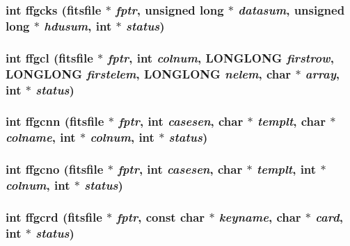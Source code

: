 \subsubsection{\setlength{\rightskip}{0pt plus 5cm}int ffgcks (\bf{fitsfile} $\ast$ {\em fptr}, unsigned long $\ast$ {\em datasum}, unsigned long $\ast$ {\em hdusum}, int $\ast$ {\em status})}\label{fitsio__64_8h_ac550539cbf9b960d2f9e4c8619a50d5}


\subsubsection{\setlength{\rightskip}{0pt plus 5cm}int ffgcl (\bf{fitsfile} $\ast$ {\em fptr}, int {\em colnum}, \bf{LONGLONG} {\em firstrow}, \bf{LONGLONG} {\em firstelem}, \bf{LONGLONG} {\em nelem}, char $\ast$ {\em array}, int $\ast$ {\em status})}\label{fitsio__64_8h_d208fea0ab2ac53456307cdc890b07ca}


\subsubsection{\setlength{\rightskip}{0pt plus 5cm}int ffgcnn (\bf{fitsfile} $\ast$ {\em fptr}, int {\em casesen}, char $\ast$ {\em templt}, char $\ast$ {\em colname}, int $\ast$ {\em colnum}, int $\ast$ {\em status})}\label{fitsio__64_8h_64f9be429b2bc87b2c632dc87da8c647}


\subsubsection{\setlength{\rightskip}{0pt plus 5cm}int ffgcno (\bf{fitsfile} $\ast$ {\em fptr}, int {\em casesen}, char $\ast$ {\em templt}, int $\ast$ {\em colnum}, int $\ast$ {\em status})}\label{fitsio__64_8h_b16df66331ffdbe091b4bf638c2fb3fb}


\subsubsection{\setlength{\rightskip}{0pt plus 5cm}int ffgcrd (\bf{fitsfile} $\ast$ {\em fptr}, const char $\ast$ {\em keyname}, char $\ast$ {\em card}, int $\ast$ {\em status})}\label{fitsio__64_8h_d5ea06a34fb3164788ecf166058654fc}


